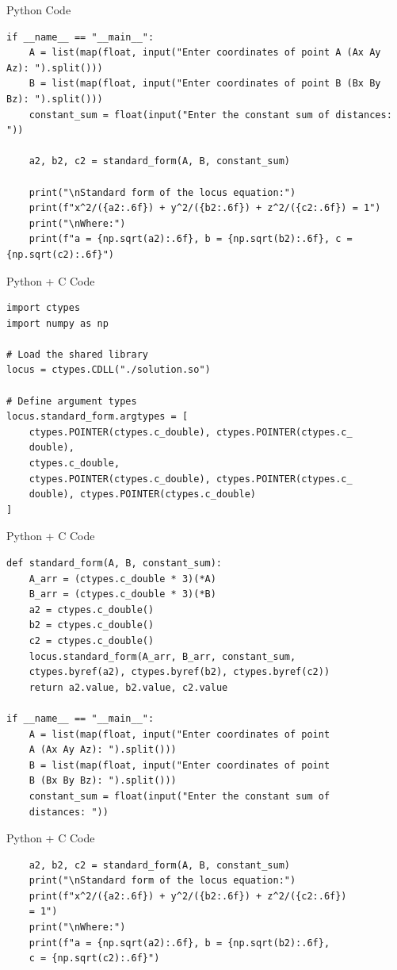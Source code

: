 \documentclass{beamer}
\begin{document}
\begin{frame}[fragile]{Python Code}
    \begin{verbatim}
if __name__ == "__main__":
    A = list(map(float, input("Enter coordinates of point A (Ax Ay Az): ").split()))
    B = list(map(float, input("Enter coordinates of point B (Bx By Bz): ").split()))
    constant_sum = float(input("Enter the constant sum of distances: "))

    a2, b2, c2 = standard_form(A, B, constant_sum)

    print("\nStandard form of the locus equation:")
    print(f"x^2/({a2:.6f}) + y^2/({b2:.6f}) + z^2/({c2:.6f}) = 1")
    print("\nWhere:")
    print(f"a = {np.sqrt(a2):.6f}, b = {np.sqrt(b2):.6f}, c = {np.sqrt(c2):.6f}")
    \end{verbatim}
\end{frame}

\begin{frame}[fragile]{Python + C Code}
    \begin{verbatim}
import ctypes
import numpy as np

# Load the shared library
locus = ctypes.CDLL("./solution.so")

# Define argument types
locus.standard_form.argtypes = [
    ctypes.POINTER(ctypes.c_double), ctypes.POINTER(ctypes.c_
    double),
    ctypes.c_double,
    ctypes.POINTER(ctypes.c_double), ctypes.POINTER(ctypes.c_
    double), ctypes.POINTER(ctypes.c_double)
]
    \end{verbatim}
\end{frame}

\begin{frame}[fragile]{Python + C Code}
    \begin{verbatim}
def standard_form(A, B, constant_sum):
    A_arr = (ctypes.c_double * 3)(*A)
    B_arr = (ctypes.c_double * 3)(*B)
    a2 = ctypes.c_double()
    b2 = ctypes.c_double()
    c2 = ctypes.c_double()
    locus.standard_form(A_arr, B_arr, constant_sum, 
    ctypes.byref(a2), ctypes.byref(b2), ctypes.byref(c2))
    return a2.value, b2.value, c2.value

if __name__ == "__main__":
    A = list(map(float, input("Enter coordinates of point 
    A (Ax Ay Az): ").split()))
    B = list(map(float, input("Enter coordinates of point 
    B (Bx By Bz): ").split()))
    constant_sum = float(input("Enter the constant sum of 
    distances: "))
    \end{verbatim}
\end{frame}

\begin{frame}[fragile]{Python + C Code}
    \begin{verbatim}
    a2, b2, c2 = standard_form(A, B, constant_sum)
    print("\nStandard form of the locus equation:")
    print(f"x^2/({a2:.6f}) + y^2/({b2:.6f}) + z^2/({c2:.6f})
    = 1")
    print("\nWhere:")
    print(f"a = {np.sqrt(a2):.6f}, b = {np.sqrt(b2):.6f}, 
    c = {np.sqrt(c2):.6f}")
    \end{verbatim}
\end{frame}
\end{document}
